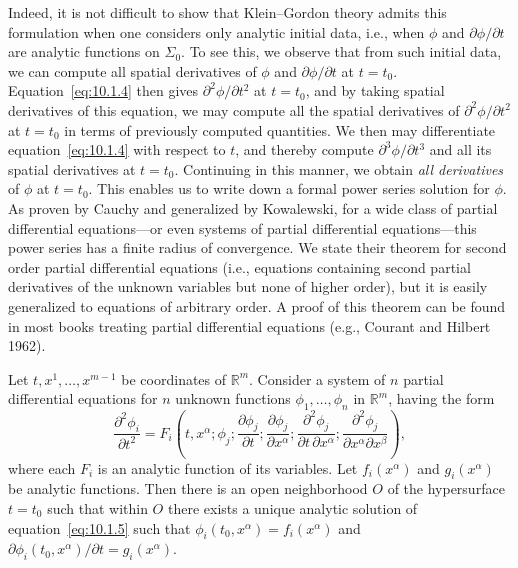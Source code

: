Indeed, it is not difficult to show that Klein--Gordon theory admits this formulation
when one considers only analytic initial data, i.e., when \(\phi\) and
\(\partial\phi/\partial t\) are analytic functions on \(\Sigma_0\). To see this, we
observe that from such initial data, we can compute all spatial derivatives of \(\phi\)
and \(\partial\phi/\partial t\) at \(t=t_0\). Equation~\eqref{eq:10.1.4} then gives
\(\partial^2\phi/\partial t^2\) at \(t=t_0\), and by taking spatial derivatives of
this equation, we may compute all the spatial derivatives of
\(\partial^2\phi/\partial t^2\) at \(t=t_0\) in terms of previously computed
quantities. We then may differentiate equation~\eqref{eq:10.1.4} with respect to
\(t\), and thereby compute \(\partial^3\phi/\partial t^3\) and all its spatial
derivatives at \(t=t_0\). Continuing in this manner, we obtain \emph{all derivatives}
of \(\phi\) at \(t=t_0\). This enables us to write down a formal power series solution
for \(\phi\). As proven by Cauchy and generalized by Kowalewski, for a wide class of
partial differential equations---or even systems of partial differential equations---this
power series has a finite radius of convergence. We state their theorem for second
order partial differential equations (i.e., equations containing second partial derivatives
of the unknown variables but none of higher order), but it is easily generalized to
equations of arbitrary order. A proof of this theorem can be found in most books
treating partial differential equations (e.g., Courant and Hilbert 1962).

\begin{theorem}\label{thm:10.1.1}
Let \(t,x^1,\ldots,x^{m-1}\) be coordinates of \(\mathbb R^m\). Consider a
system of \(n\) partial differential equations for \(n\) unknown functions
\(\phi_1,\ldots,\phi_n\) in \(\mathbb R^m\), having the form
\begin{equation}
  \frac{\partial^2\phi_i}{\partial t^2}
  =F_i\left(t,x^\alpha;\phi_j;
    \frac{\partial\phi_j}{\partial t};
    \frac{\partial\phi_j}{\partial x^\alpha};
    \frac{\partial^2\phi_j}{\partial t\,\partial x^\alpha};
    \frac{\partial^2\phi_j}{\partial x^\alpha\partial x^\beta}\right),
  \tag{10.1.5}\label{eq:10.1.5}
\end{equation}
where each \(F_i\) is an analytic function of its variables. Let \(f_i(x^\alpha)\)
and \(g_i(x^\alpha)\) be analytic functions. Then there is an open neighborhood
\(O\) of the hypersurface \(t=t_0\) such that within \(O\) there exists a unique
analytic solution of equation~\eqref{eq:10.1.5} such that
\(\phi_i(t_0,x^\alpha)=f_i(x^\alpha)\) and
\(\partial\phi_i(t_0,x^\alpha)/\partial t=g_i(x^\alpha)\).
\end{theorem}

